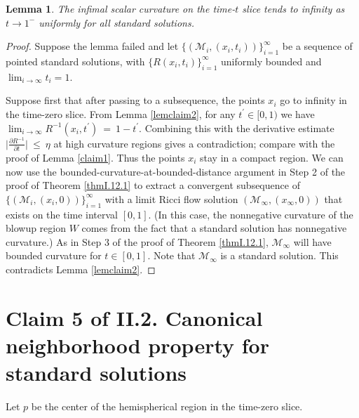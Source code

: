 \documentclass[12pt]{amsart}
\newcommand{\M}{{\mathcal M}}
\newcommand{\ra}{\rightarrow}
\numberwithin{equation}{section}
\theoremstyle{plain}
\newtheorem{lemma}[equation]{Lemma}
\theoremstyle{definition}
\theoremstyle{remark}
\begin{document}
\begin{lemma} \label{scalarblowup}
The infimal scalar curvature on the time-$t$ slice
tends to infinity as $t\ra 1^-$ uniformly for all standard solutions.
\end{lemma}
\begin{proof}
Suppose the lemma failed and 
let $\{(\M_i,(x_i,t_i))\}_{i=1}^\infty$ 
be a sequence of pointed standard solutions,
with 
$\{R(x_i, t_i)\}_{i=1}^\infty$ 
uniformly bounded and $\lim_{i \rightarrow \infty} t_i = 1$.

Suppose first that after passing to a subsequence, 
the points $x_i$ go to infinity in the time-zero
slice. From Lemma \ref{lemclaim2}, for any $t^\prime \in [0,1)$ we have
$\lim_{i \rightarrow \infty} R^{-1}(x_i, t^\prime) \: = \: 1-t^\prime$.
Combining this with the derivative estimate 
$\Big| \frac{\partial R^{-1}}{\partial t} \Big| \: \le \: \eta$ at high
curvature regions gives a contradiction; compare with the proof
of Lemma \ref{claim1}.
Thus the points $x_i$ stay in a compact region. 
We can now use
the bounded-curvature-at-bounded-distance argument in Step 2 of
the proof of Theorem \ref{thmI.12.1} to extract
a convergent subsequence of $\{(\M_i,(x_i,0))\}_{i=1}^\infty$
with a limit Ricci flow solution
$(\M_\infty,(x_\infty,0))$ that exists on
the time interval $[0,1]$.
(In this case, the nonnegative curvature of the blowup
region $W$ comes from the
fact that a standard solution has nonnegative curvature.)
As in Step 3 of the proof of Theorem
\ref{thmI.12.1}, $\M_\infty$ will have
bounded curvature for $t \in [0,1]$.
Note that $\M_\infty$ is a standard solution.  
This contradicts Lemma \ref{lemclaim2}.
\end{proof}

\section{Claim 5 of II.2. Canonical neighborhood property for
standard solutions}
\label{secclaim5}

Let $p$ be the center of the hemispherical region in the time-zero slice.
\end{document}
